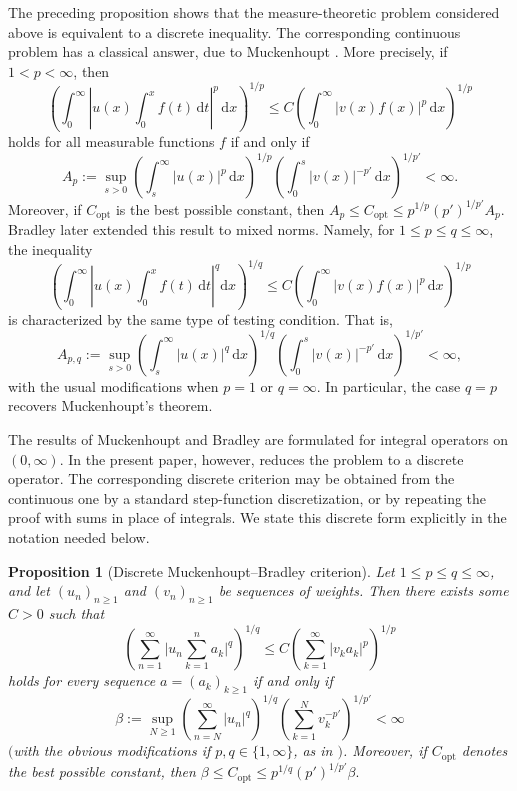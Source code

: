 \documentclass[oneside,10pt]{article}          %
\newtheorem{prop}{Proposition}
\numberwithin{equation}{section}
\begin{document}
The preceding proposition shows that the measure-theoretic problem considered above is equivalent to a discrete  inequality. The corresponding continuous problem has a classical answer, due to Muckenhoupt \cite{Muckenhoupt}. More precisely, if $1<p<\infty$, then
\[
\left(\int_0^\infty \left|u(x)\int_0^x f(t)\,\mathrm{d}t \right|^p \,\mathrm{d}x \right)^{\!\!1/p}\!
\le C \left( \int_0^\infty |v(x)f(x)|^p\,\mathrm{d}x \right)^{\!\!1/p}
\]
holds for all measurable functions $f$ if and only if
\[
A_p:= \sup_{s>0} \left(\int_s^\infty |u(x)|^p\,\mathrm{d}x\right)^{\!\!1/p}\! \left(\int_0^s |v(x)|^{-p'}\,\mathrm{d}x\right)^{\!\!1/p'} <\infty .
\]
Moreover, if $C_{\mathrm{opt}}$ is the best possible constant, then $A_p\le C_{\mathrm{opt}} \le p^{1/p}(p')^{1/p'}A_p .$ 
%
Bradley \cite{Bradley} later extended this result to mixed norms. Namely, for $1\le p\le q\le\infty$, the inequality\vspace{-1pt}
\[
\left(\int_0^\infty\left|u(x)\int_0^x f(t)\,\mathrm{d}t\right|^q \mathrm{d}x\right)^{\!\!1/q} \!\le C\left(\int_0^\infty |v(x)f(x)|^p\,\mathrm{d}x\right)^{\!\!1/p}
\]
is characterized by the same type of testing condition. That is,\vspace{-1pt}
\[
A_{p,q}:= \sup_{s>0} \left(\int_s^\infty |u(x)|^q\,\mathrm{d}x\right)^{\!\!1/q} \!\left(\int_0^s |v(x)|^{-p'}\,\mathrm{d}x\right)^{\!\!1/p'}\! <\infty ,
\]
with the usual modifications when $p=1$ or $q=\infty$. In particular, the case $q=p$ recovers Muckenhoupt's theorem.

The results of Muckenhoupt and Bradley are formulated for integral operators on $(0,\infty)$. In the present paper, however,  reduces the problem to a discrete operator. The corresponding discrete criterion may be obtained from the continuous one by a standard step-function discretization, or by repeating the proof with sums in place of integrals. We state this discrete form explicitly in the notation needed below.

\begin{prop}[Discrete Muckenhoupt--Bradley criterion]\label{prop - old}
Let $1\leq p\leq q\leq \infty$, and let
$(u_n)_{n\ge1}$ and $(v_n)_{n\ge1}$ be sequences of weights. Then there exists some $C>0$ such that\vspace{-1pt}
\[
\left(\sum_{n=1}^{\infty} \bigg| u_n\sum_{k=1}^n a_k \bigg|^q \right)^{\!\!1/q}\!\! \le C \left(\sum_{k=1}^{\infty}|v_ka_k|^p \right)^{\!\!1/p}
\]
holds for every sequence $a=(a_k)_{k\ge1}$ if and only if\vspace{-1.5pt}
\[
\beta := \sup_{N\ge1} \left(\sum_{n=N}^{\infty} |u_n|^q\right)^{\!\!1/q}\! \left(\sum_{k=1}^N v_k^{-p'}\right)^{\!\!1/p'}\!
<\infty
\]
\!$($\!with the obvious modifications if $p,q\in\{1,\infty\}$, as in \!$)$. Moreover, if $C_{\mathrm{opt}}$ denotes the best possible constant, then $\beta \le C_{\mathrm{opt}} \le p^{1/q}(p')^{1/p'}\beta .$
\end{prop}
\end{document}
